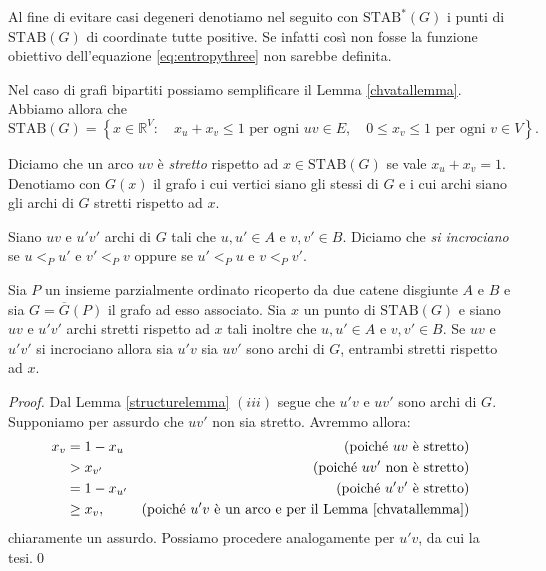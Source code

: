 Al fine di evitare casi degeneri denotiamo nel seguito con \(\text{STAB}^{*}(G)\) i punti di \(\text{STAB}(G)\) di coordinate tutte positive. Se infatti così non fosse la funzione obiettivo dell'equazione \eqref{eq:entropythree} non sarebbe definita.

Nel caso di grafi bipartiti possiamo semplificare il Lemma \ref{chvatallemma}. Abbiamo allora che
\[\text{STAB}(G)=\left\{x\in \mathbb{R}^V:\quad x_u + x_v\le 1 \text{ per ogni } uv\in E,\quad 0\le x_v\le 1 \text{ per ogni } v\in V\right\}.\]
\begin{definition}
  Diciamo che un arco \(uv\) è \emph{stretto} rispetto ad \(x\in\text{STAB}(G)\) se vale \(x_u+x_v=1\). Denotiamo con \(G(x)\) il grafo i cui vertici siano gli stessi di \(G\) e i cui archi siano gli archi di \(G\) stretti rispetto ad \(x\). 
\end{definition}
\begin{definition}
  Siano \(uv\) e \(u'v'\) archi di \(G\) tali che \(u,u'\in A\) e \(v,v'\in B\). Diciamo che \emph{si incrociano} se \(u<_{P}u'\) e \(v'<_{P}v\) oppure se \(u'<_{P}u\) e \(v<_{P}v'\). 
\end{definition}
\begin{lemma}
  \label{crossinglemma} Sia \(P\) un insieme parzialmente ordinato ricoperto da due catene disgiunte \(A\) e \(B\) e sia \(G=\overline{G}(P)\) il grafo ad esso associato. Sia \(x\) un punto di \(\text{STAB}(G)\) e siano \(uv\) e \(u'v'\) archi stretti rispetto ad \(x\) tali inoltre che \(u,u'\in A\) e \(v,v'\in B\). Se \(uv\) e \(u'v'\) si incrociano allora sia \(u'v\) sia \(uv'\) sono archi di \(G\), entrambi stretti rispetto ad \(x\). 
\end{lemma}
\begin{proof}
  Dal Lemma \ref{structurelemma} \((iii)\) segue che \(u'v\) e \(uv'\) sono archi di \(G\). Supponiamo per assurdo che \(uv'\) non sia stretto. Avremmo allora: 
  \begin{align}
    x_v &= 1-x_u &\text{(poiché } uv \text{ è stretto)}\nonumber \\
    &> x_{v'} &\text{(poiché } uv' \text{ non è stretto)}\nonumber \\
    &= 1-x_{u'} &\text{(poiché } u'v' \text{ è stretto)}\nonumber \\
    &\ge x_{v}, &\text{(poiché } u'v \text{ è un arco e per il Lemma \ref{chvatallemma})}\nonumber 
  \end{align}
  chiaramente un assurdo. Possiamo procedere analogamente per \(u'v\), da cui la tesi.\qed 
\end{proof}
